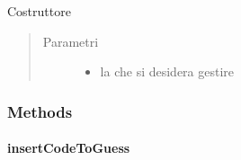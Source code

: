 \documentclass[letterpaper,10pt,italian,openany,oneside]{sphinxmanual}
\begin{document}
\begin{fulllineitems}
\label{\detokenize{source/it/unicam/cs/pa/mastermind/gamecore/BoardController:it.unicam.cs.pa.mastermind.gamecore.BoardController.BoardController(BoardModel)}}
Costruttore
\begin{quote}\begin{description}
\item[{Parametri}] \leavevmode\begin{itemize}
\item {} 
 \textendash{} la  che si desidera gestire

\end{itemize}

\end{description}\end{quote}

\end{fulllineitems}



\subsubsection{Methods}
\label{\detokenize{source/it/unicam/cs/pa/mastermind/gamecore/BoardController:methods}}

\paragraph{insertCodeToGuess}
\label{\detokenize{source/it/unicam/cs/pa/mastermind/gamecore/BoardController:insertcodetoguess}}
\end{document}
